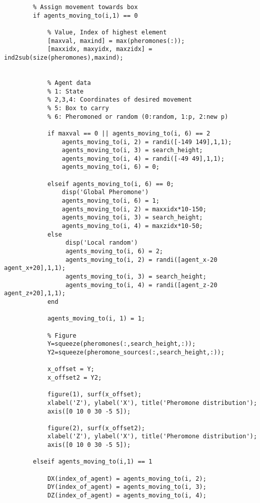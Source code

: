 \begin{lstlisting}
        % Assign movement towards box
        if agents_moving_to(i,1) == 0

            % Value, Index of highest element
            [maxval, maxind] = max(pheromones(:));
            [maxxidx, maxyidx, maxzidx] = ind2sub(size(pheromones),maxind);
            
            
            % Agent data
            % 1: State
            % 2,3,4: Coordinates of desired movement
            % 5: Box to carry
            % 6: Pheromoned or random (0:random, 1:p, 2:new p)
            
            if maxval == 0 || agents_moving_to(i, 6) == 2
                agents_moving_to(i, 2) = randi([-149 149],1,1);
                agents_moving_to(i, 3) = search_height; 
                agents_moving_to(i, 4) = randi([-49 49],1,1);
                agents_moving_to(i, 6) = 0;
                
            elseif agents_moving_to(i, 6) == 0;
                disp('Global Pheromone')
                agents_moving_to(i, 6) = 1;
                agents_moving_to(i, 2) = maxxidx*10-150;
                agents_moving_to(i, 3) = search_height; 
                agents_moving_to(i, 4) = maxzidx*10-50;
            else 
                 disp('Local random')
                 agents_moving_to(i, 6) = 2;
                 agents_moving_to(i, 2) = randi([agent_x-20 agent_x+20],1,1);
                 agents_moving_to(i, 3) = search_height; 
                 agents_moving_to(i, 4) = randi([agent_z-20 agent_z+20],1,1);
            end
            
            agents_moving_to(i, 1) = 1;
            
            % Figure
            Y=squeeze(pheromones(:,search_height,:));
            Y2=squeeze(pheromone_sources(:,search_height,:));
            
            x_offset = Y;
            x_offset2 = Y2;

            figure(1), surf(x_offset);
            xlabel('Z'), ylabel('X'), title('Pheromone distribution');
            axis([0 10 0 30 -5 5]);
            
            figure(2), surf(x_offset2);
            xlabel('Z'), ylabel('X'), title('Pheromone distribution');
            axis([0 10 0 30 -5 5]);

        elseif agents_moving_to(i,1) == 1
            
            DX(index_of_agent) = agents_moving_to(i, 2);
            DY(index_of_agent) = agents_moving_to(i, 3);
            DZ(index_of_agent) = agents_moving_to(i, 4);
            

\end{lstlisting}

